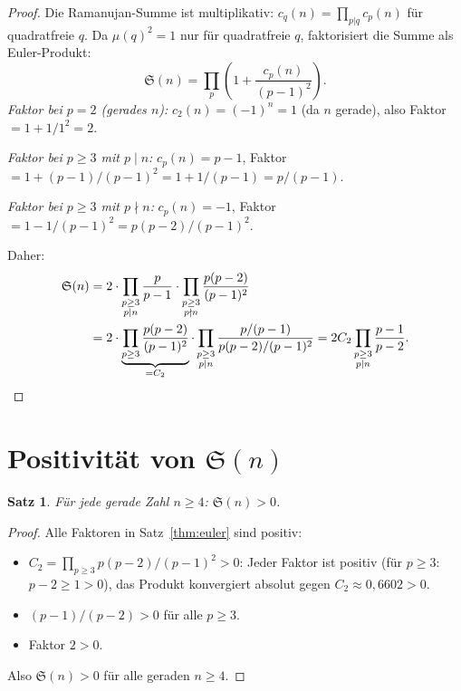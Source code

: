 \documentclass[12pt,a4paper]{amsart}
\newtheorem{theorem}{Satz}[section]
\theoremstyle{definition}
\begin{document}
\begin{proof}
  Die Ramanujan-Summe ist multiplikativ: $c_q(n) = \prod_{p|q} c_p(n)$ für
  quadratfreie $q$.  Da $\mu(q)^2 = 1$ nur für quadratfreie $q$, faktorisiert
  die Summe als Euler-Produkt:
  \[
    \mathfrak{S}(n) = \prod_p \left(1 + \frac{c_p(n)}{(p-1)^2}\right).
  \]
  \textit{Faktor bei $p=2$ (gerades $n$):}
  $c_2(n) = (-1)^n = 1$ (da $n$ gerade), also Faktor $= 1+1/1^2=2$.

  \textit{Faktor bei $p \geq 3$ mit $p \mid n$:}
  $c_p(n) = p-1$, Faktor $= 1+(p-1)/(p-1)^2 = 1+1/(p-1) = p/(p-1)$.

  \textit{Faktor bei $p \geq 3$ mit $p \nmid n$:}
  $c_p(n) = -1$, Faktor $= 1 - 1/(p-1)^2 = p(p-2)/(p-1)^2$.

  Daher:
  \begin{align*}
    \mathfrak{S}(n)
    &= 2 \cdot \prod_{\substack{p \geq 3 \\ p \mid n}} \frac{p}{p-1}
        \cdot \prod_{\substack{p \geq 3 \\ p \nmid n}} \frac{p(p-2)}{(p-1)^2} \\
    &= 2 \cdot \underbrace{\prod_{p \geq 3} \frac{p(p-2)}{(p-1)^2}}_{= C_2}
        \cdot \prod_{\substack{p \geq 3 \\ p \mid n}} \frac{p/(p-1)}{p(p-2)/(p-1)^2}
     = 2 C_2 \prod_{\substack{p \geq 3 \\ p \mid n}} \frac{p-1}{p-2}.  \qedhere
  \end{align*}
\end{proof}

\section{Positivität von \texorpdfstring{$\mathfrak{S}(n)$}{S(n)}}
\label{sec:pos}

\begin{theorem}\label{thm:pos}
  Für jede gerade Zahl $n \geq 4$: $\mathfrak{S}(n) > 0$.
\end{theorem}

\begin{proof}
  Alle Faktoren in Satz~\ref{thm:euler} sind positiv:
  \begin{itemize}
    \item $C_2 = \prod_{p\geq 3} p(p-2)/(p-1)^2 > 0$: Jeder Faktor ist positiv
      (für $p \geq 3$: $p-2 \geq 1 > 0$), das Produkt konvergiert absolut
      gegen $C_2 \approx 0{,}6602 > 0$.
    \item $(p-1)/(p-2) > 0$ für alle $p \geq 3$.
    \item Faktor $2 > 0$.
  \end{itemize}
  Also $\mathfrak{S}(n) > 0$ für alle geraden $n \geq 4$.
\end{proof}
\end{document}
